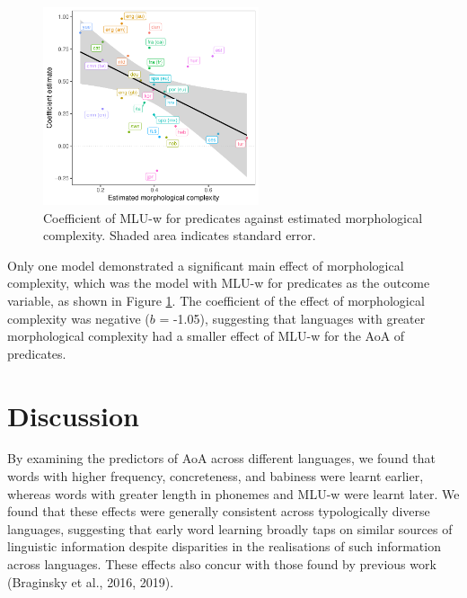 \documentclass[10pt, letterpaper]{article}
\newenvironment{CodeChunk}{}{}
\begin{document}
\begin{CodeChunk}
\begin{figure}[ht]

{\centering \includegraphics[width=240px]{figs/mlu_pred-1}

}

\caption[Coefficient of MLU-w for predicates against estimated morphological complexity]{Coefficient of MLU-w for predicates against estimated morphological complexity. Shaded area indicates standard error.}\label{fig:mlu_pred}
\end{figure}
\end{CodeChunk}

Only one model demonstrated a significant main effect of morphological
complexity, which was the model with MLU-w for predicates as the outcome
variable, as shown in Figure \ref{fig:mlu_pred}. The coefficient of the
effect of morphological complexity was negative (\(b\) = -1.05),
suggesting that languages with greater morphological complexity had a
smaller effect of MLU-w for the AoA of predicates.

\hypertarget{discussion}{%
\section{Discussion}\label{discussion}}

By examining the predictors of AoA across different languages, we found
that words with higher frequency, concreteness, and babiness were learnt
earlier, whereas words with greater length in phonemes and MLU-w were
learnt later. We found that these effects were generally consistent
across typologically diverse languages, suggesting that early word
learning broadly taps on similar sources of linguistic information
despite disparities in the realisations of such information across
languages. These effects also concur with those found by previous work
(Braginsky et al., 2016, 2019).
\end{document}
